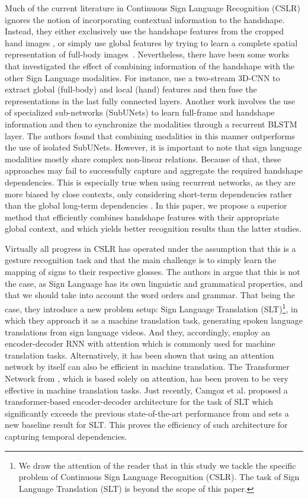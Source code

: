 \documentclass[a4paper,conference]{IEEEtran}
\begin{document}
Much of the current literature in Continuous Sign Language Recognition (CSLR) ignores the notion of incorporating contextual information to the handshape. Instead, they either exclusively use the handshape features from the cropped hand images \cite{koller2016deep}, or simply use global features by trying to learn a complete spatial representation of full-body images~\cite{koller2017re,wu2016deep}. Nevertheless, there have been some works that investigated the effect of combining information of the handshape with the other Sign Language modalities. For instance, \cite{huang2018video} use a two-stream 3D-CNN to extract global (full-body) and local (hand) features and then fuse the representations in the last fully connected layers. Another work \cite{camgoz2017subunets} involves the use of specialized sub-networks (SubUNets) to learn full-frame and handshape information and then to synchronize the modalities through a recurrent BLSTM layer. The authors found that combining modalities in this manner outperforms the use of isolated SubUNets.
However, it is important to note that sign language modalities mostly share complex non-linear relations. Because of that, these approaches may fail to successfully capture and aggregate the required handshape dependencies. This is especially true when using recurrent networks, as they are more biased by close contexts, only considering short-term dependencies rather than the global long-term dependencies \cite{bengio1994learning}. In this paper, we propose a superior method that efficiently combines handshape features with their appropriate global context, and which yields better recognition results than the latter studies. 

Virtually all progress in CSLR has operated under the assumption that this is a gesture recognition task and that the main challenge is to simply learn the mapping of signs to their respective glosses. The authors in \cite{cihan2018neural} argue that this is not the case, as Sign Language has its own linguistic and grammatical properties, and that we should take into account the word orders and grammar. That being the case, they introduce a new problem setup: Sign Language Translation (SLT)\footnote{We draw the attention of the reader that in this study we tackle the specific problem of Continuous Sign Language Recognition (CSLR). The task of Sign Language Translation (SLT) is beyond the scope of this paper.}, in which they approach it as a machine translation task, generating spoken language translations from sign language videos. And they, accordingly, employ an encoder-decoder RNN with attention which is commonly used for machine translation tasks. Alternatively, it has been shown that using an attention network by itself can also be efficient in machine translation. The Transformer Network from \cite{vaswani2017attention}, which is based solely on attention, has been proven to be very effective in machine translation tasks. Just recently, Camgoz et al. \cite{camgoz2020} proposed a transformer-based encoder-decoder architecture for the task of SLT which significantly exceeds the previous state-of-the-art performance from \cite{cihan2018neural} and sets a new baseline result for SLT. This proves the efficiency of such architecture for capturing temporal dependencies. 
\end{document}
